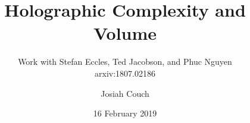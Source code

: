 \documentclass[8pt,aspectratio=169]{beamer}
\title{Holographic Complexity and Volume}
\subtitle{Work with Stefan Eccles, Ted Jacobson, and Phuc Nguyen\\ arxiv:1807.02186}
\author{Josiah Couch}
\institute{University of Texas at Austin}
\date{16 February 2019}
\begin{document}
\begin{frame}
\titlepage\end{frame}
\end{document}
